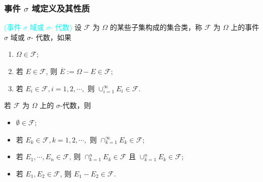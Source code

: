 \begin{frame}
	\frametitle{事件 $\sigma$ 域定义及其性质}

	\begin{defi}\textcolor{cyan}{(事件 $\sigma$ 域或 $\sigma$- 代数)} 设 $\mathcal{F}$ 为 $\Omega$ 的某些子集构成的集合类，称 $\mathcal{F}$ 为 $\Omega$ 上的事件 $\sigma$ 域或 $\sigma$- 代数，如果
		\begin{enumerate}[<+-|alert@+>]
			\item $\Omega\in \mathcal{F}$;
			\item 若 $E\in \mathcal{F}$, 则 $\overline{E}:=\Omega-E\in \mathcal{F}$;
			\item 若 $E_i\in \mathcal{F}, i=1, 2,\cdots,$ 则 $\cup_{i=1}^{\infty} E_i\in \mathcal{F}$.
		\end{enumerate}
	\end{defi}
	\pause

	\begin{thm} 若 $\mathcal{F}$ 为 $\Omega$ 上的 $\sigma$-代数，则
		\begin{itemize}[<+-|alert@+>]
			\item $\emptyset\in \mathcal{F}$;
			\item 若 $E_k\in \mathcal{F}, k=1,2,\cdots,$ 则 $\cap_{k=1}^\infty E_k\in \mathcal{F}$;
			\item 若 $E_1,\cdots, E_n\in \mathcal{F}$, 则 $\cap_{k=1}^nE_k\in \mathcal{F}$ 且 $\cup_{k=1}^nE_k\in \mathcal{F}$;

			\item 若 $E_1,E_2\in\mathcal{F}$, 则 $E_1-E_2\in \mathcal{F}$.
		\end{itemize}
	\end{thm}
\end{frame}

